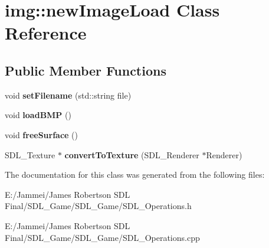 \hypertarget{classimg_1_1new_image_load}{\section{img\+:\+:new\+Image\+Load Class Reference}
\label{classimg_1_1new_image_load}
}
\subsection*{Public Member Functions}
\begin{DoxyCompactItemize}
\item 
\hypertarget{classimg_1_1new_image_load_a38e0586388f93808d9279d554c77f88c}{void {\bfseries set\+Filename} (std\+::string file)}\label{classimg_1_1new_image_load_a38e0586388f93808d9279d554c77f88c}

\item 
\hypertarget{classimg_1_1new_image_load_af42dda3ce5d84569c549a7be6eba239c}{void {\bfseries load\+B\+M\+P} ()}\label{classimg_1_1new_image_load_af42dda3ce5d84569c549a7be6eba239c}

\item 
\hypertarget{classimg_1_1new_image_load_a8b22829fd3ed0bc516ad82784215a727}{void {\bfseries free\+Surface} ()}\label{classimg_1_1new_image_load_a8b22829fd3ed0bc516ad82784215a727}

\item 
\hypertarget{classimg_1_1new_image_load_aadcb286446f35bff40d1797d34aba9b6}{S\+D\+L\+\_\+\+Texture $\ast$ {\bfseries convert\+To\+Texture} (S\+D\+L\+\_\+\+Renderer $\ast$Renderer)}\label{classimg_1_1new_image_load_aadcb286446f35bff40d1797d34aba9b6}

\end{DoxyCompactItemize}


The documentation for this class was generated from the following files\+:\begin{DoxyCompactItemize}
\item 
E\+:/\+Jammei/\+James Robertson S\+D\+L Final/\+S\+D\+L\+\_\+\+Game/\+S\+D\+L\+\_\+\+Game/S\+D\+L\+\_\+\+Operations.\+h\item 
E\+:/\+Jammei/\+James Robertson S\+D\+L Final/\+S\+D\+L\+\_\+\+Game/\+S\+D\+L\+\_\+\+Game/S\+D\+L\+\_\+\+Operations.\+cpp\end{DoxyCompactItemize}
